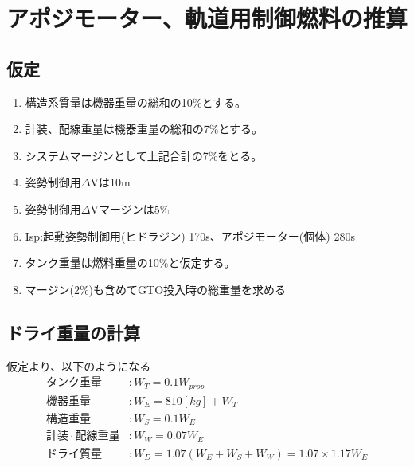 \documentclass[15pt,uplatex,dvipdfmx]{jsarticle}
\begin{document}
\setcounter{section}{3}
\section{アポジモーター、軌道用制御燃料の推算}

\subsection{仮定}
\begin{enumerate}
  \item 構造系質量は機器重量の総和の10\%とする。
  \item 計装、配線重量は機器重量の総和の7\%とする。
  \item システムマージンとして上記合計の7\%をとる。
  \item 姿勢制御用$\Delta$Vは10m
  \item 姿勢制御用$\Delta$Vマージンは5\%
  \item Isp:起動姿勢制御用(ヒドラジン) 170s、アポジモーター(個体) 280s
  \item タンク重量は燃料重量の10\%と仮定する。
  \item マージン(2\%)も含めてGTO投入時の総重量を求める
\end{enumerate}

\subsection{ドライ重量の計算}
 仮定より、以下のようになる
 \begin{align*}
   タンク重量 & : W_T = 0.1W_{prop} \\
   機器重量 & : W_E = 810[kg] + W_T \\
   構造重量 & : W_S = 0.1W_E \\
   計装 \cdot 配線重量 & : W_W = 0.07W_E \\
   ドライ質量 & : W_D = 1.07(W_E + W_S + W_W) = 1.07 \times 1.17 W_E \\
 \end{align*}
\end{document}
